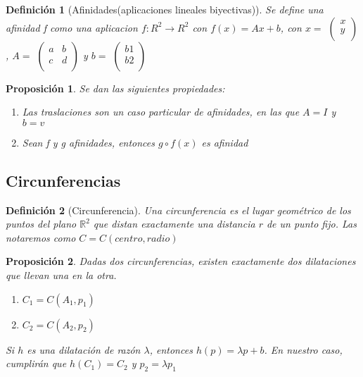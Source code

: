 \documentclass[11pt, a4paper, titlepage]{article}
\newcommand{\R}{\mathbb{R}}
\theoremstyle{theorem-style}
\newtheorem*{nprop}{Proposición}
\theoremstyle{definition-style}
\newtheorem*{ndef}{Definición}
\theoremstyle{remark-style}
\theoremstyle{example-style}
\newenvironment{nlist}
{\begin{enumerate}
\renewcommand\labelenumi{(\emph{\roman{enumi})}}}
{\end{enumerate}}
\begin{document}
\begin{ndef}[Afinidades(aplicaciones lineales biyectivas)]
	Se define una afinidad f como una aplicacion $f:R^2 \rightarrow R^2$ con $f(x) = Ax + b$, con $x =$ $\begin{pmatrix}
	x\\
	y\\
\end{pmatrix}$, $A =$ $\begin{pmatrix}
	a & b\\
	c & d\\
\end{pmatrix}$
y $b =$ $\begin{pmatrix}
	b1\\
	b2\\
\end{pmatrix}$


\end{ndef}


\begin{nprop}
Se dan las siguientes propiedades:
\begin{nlist}
	\item Las traslaciones son un caso particular de afinidades, en las que $A = I$ y $b = v$
	\item Sean f y g afinidades, entonces $g \circ f (x)$ es afinidad
\end{nlist}
\end{nprop}


\subsection{Circunferencias}

\begin{ndef}[Circunferencia]
	Una circunferencia es el lugar geométrico de los puntos del plano $\R^2$ que distan exactamente una distancia $r$ de un punto fijo. Las notaremos como $C = C(centro,radio)$
\end{ndef}

\begin{nprop}
	Dadas dos circunferencias, existen exactamente dos dilataciones que llevan una en la otra.
	\begin{enumerate}
	\item $C_1 = C(A_1,p_1)$
	\item $C_2 = C(A_2,p_2)$
\end{enumerate}
Si $h$ es una dilatación de razón $\lambda$, entonces $h(p) = \lambda p + b$.
En nuestro caso, cumplirán que $h(C_1) = C_2$ y $p_2 = \lambda p_1$
\end{nprop}
\end{document}
